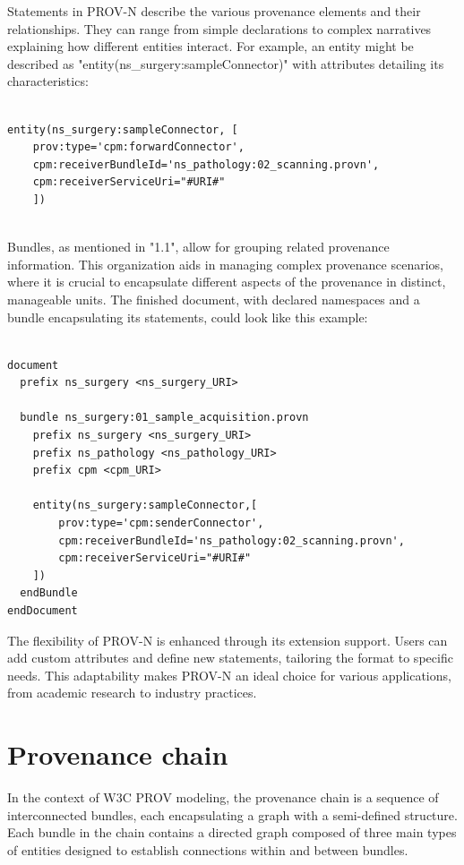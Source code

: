 \documentclass[
  digital,     %
  oneside,     %
  nosansbold,  %
  nocolorbold, %
  lof,         %
  lot,         %
]{fithesis4}
\begin{document}
Statements in PROV-N describe the various provenance elements and their relationships. They can range from simple declarations to complex narratives explaining how different entities interact. For example, an entity might be described as "entity(ns\_surgery:sampleConnector)" with attributes detailing its characteristics:

\begin{verbatim}

entity(ns_surgery:sampleConnector, [
    prov:type='cpm:forwardConnector', 
    cpm:receiverBundleId='ns_pathology:02_scanning.provn', 
    cpm:receiverServiceUri="#URI#"
    ])
    
\end{verbatim}

Bundles, as mentioned in "1.1", allow for grouping related provenance information. This organization aids in managing complex provenance scenarios, where it is crucial to encapsulate different aspects of the provenance in distinct, manageable units. The finished document, with declared namespaces and a bundle encapsulating its statements, could look like this example:

\begin{verbatim}

document
  prefix ns_surgery <ns_surgery_URI>

  bundle ns_surgery:01_sample_acquisition.provn
    prefix ns_surgery <ns_surgery_URI>
    prefix ns_pathology <ns_pathology_URI>
    prefix cpm <cpm_URI>

    entity(ns_surgery:sampleConnector,[
        prov:type='cpm:senderConnector',
        cpm:receiverBundleId='ns_pathology:02_scanning.provn',
        cpm:receiverServiceUri="#URI#"
    ])
  endBundle
endDocument

\end{verbatim}

The flexibility of PROV-N is enhanced through its extension support. Users can add custom attributes and define new statements, tailoring the format to specific needs. This adaptability makes PROV-N an ideal choice for various applications, from academic research to industry practices.
\shorthandon{-}

\section{Provenance chain} \label{s-provchain}
\shorthandoff{-}
In the context of W3C PROV modeling, the provenance chain is a sequence of interconnected bundles, each encapsulating a graph with a semi-defined structure. Each bundle in the chain contains a directed graph composed of three main types of entities designed to establish connections within and between bundles.
\end{document}
